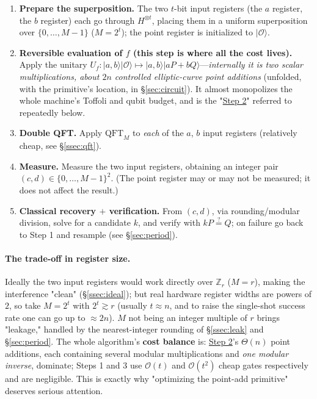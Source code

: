 \documentclass[11pt]{article}
\newcommand{\secref}[1]{\hyperref[#1]{\S\ref*{#1}}}
\begin{document}
\begin{enumerate}[label=\textbf{Step \arabic*.},leftmargin=3.8em,itemsep=3pt]
\item\label{step:prep} \textbf{Prepare the superposition.} The two $t$-bit input registers (the $a$ register, the $b$ register) each go through $H^{\otimes t}$, placing them in a uniform superposition over
$\{0,\dots,M-1\}$ ($M=2^t$); the point register is initialized to $\lvert\mathcal{O}\rangle$.
\item\label{step:eval} \textbf{Reversible evaluation of $f$ (this step is where all the cost lives).} Apply the unitary $U_f:\lvert a,b\rangle\lvert\mathcal{O}\rangle\mapsto
\lvert a,b\rangle\lvert aP+bQ\rangle$---\emph{internally it is two scalar multiplications, about $2n$ controlled elliptic-curve point additions}
(unfolded, with the primitive's location, in \secref{sec:circuit}). It almost monopolizes the whole machine's Toffoli and qubit budget, and is the
"\hyperref[step:eval]{Step 2}" referred to repeatedly below.
\item\label{step:qft} \textbf{Double QFT.} Apply $\mathrm{QFT}_M$ to \emph{each} of the $a$, $b$ input registers (relatively cheap, see \secref{ssec:qft}).
\item\label{step:measure} \textbf{Measure.} Measure the two input registers, obtaining an integer pair $(c,d)\in\{0,\dots,M-1\}^2$. (The point register may or may not be measured; it does not affect the result.)
\item\label{step:recover} \textbf{Classical recovery $+$ verification.} From $(c,d)$, via rounding/modular division, solve for a candidate $k$, and verify with $kP\stackrel{?}{=}Q$; on failure go back to Step 1
and resample (see \secref{sec:period}).
\end{enumerate}

\paragraph{The trade-off in register size.}
Ideally the two input registers would work directly over $\mathbb{Z}_r$ ($M=r$), making the interference "clean" (\secref{ssec:ideal}); but real
hardware register widths are powers of $2$, so take $M=2^t$ with $2^t\gtrsim r$ (usually $t\approx n$, and to raise the single-shot success rate one can go up to $\approx 2n$).
$M$ not being an integer multiple of $r$ brings "leakage," handled by the nearest-integer rounding of \secref{ssec:leak} and \secref{sec:period}. The whole algorithm's \textbf{cost
balance} is: \hyperref[step:eval]{Step 2}'s $\Theta(n)$ point additions, each containing several modular multiplications and \emph{one modular inverse}, dominate; Steps 1 and 3 use $\mathcal{O}(t)$ and
$\mathcal{O}(t^2)$ cheap gates respectively and are negligible. This is exactly why "optimizing the point-add primitive" deserves serious attention.
\end{document}
